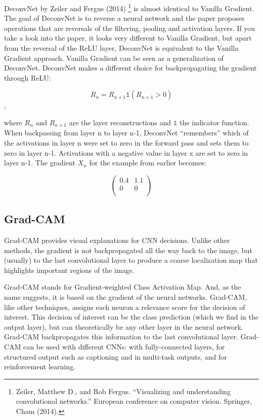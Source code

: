 \documentclass[
  11pt,
]{scrbook}
\begin{document}
DeconvNet by Zeiler and Fergus (2014) \footnote{Zeiler, Matthew D., and Rob Fergus. ``Visualizing and understanding convolutional networks.'' European conference on computer vision. Springer, Cham (2014).} is almost identical to Vanilla Gradient.
The goal of DeconvNet is to reverse a neural network and the paper proposes operations that are reversals of the filtering, pooling and activation layers.
If you take a look into the paper, it looks very different to Vanilla Gradient, but apart from the reversal of the ReLU layer, DeconvNet is equivalent to the Vanilla Gradient approach.
Vanilla Gradient can be seen as a generalization of DeconvNet.
DeconvNet makes a different choice for backpropagating the gradient through ReLU:

\[R_n=R_{n+1}\mathbb{1}(R_{n+1}>0)\],

where \(R_n\) and \(R_{n+1}\) are the layer reconstructions and \(\mathbb{1}\) the indicator function.
When backpassing from layer n to layer n-1, DeconvNet ``remembers'' which of the activations in layer n were set to zero in the forward pass and sets them to zero in layer n-1.
Activations with a negative value in layer x are set to zero in layer n-1.
The gradient \(X_n\) for the example from earlier becomes:

\[
\begin{pmatrix}
0.4 & 1.1 \\
0 & 0  \\
\end{pmatrix}
\]

\hypertarget{grad-cam}{%
\subsection{Grad-CAM}\label{grad-cam}}

Grad-CAM provides visual explanations for CNN decisions.
Unlike other methods, the gradient is not backpropagated all the way back to the image, but (usually) to the last convolutional layer to produce a coarse localization map that highlights important regions of the image.

Grad-CAM stands for Gradient-weighted Class Activation Map.
And, as the name suggests, it is based on the gradient of the neural networks.
Grad-CAM, like other techniques, assigns each neuron a relevance score for the decision of interest.
This decision of interest can be the class prediction (which we find in the output layer), but can theoretically be any other layer in the neural network.
Grad-CAM backpropagates this information to the last convolutional layer.
Grad-CAM can be used with different CNNs: with fully-connected layers, for structured output such as captioning and in multi-task outputs, and for reinforcement learning.
\end{document}
